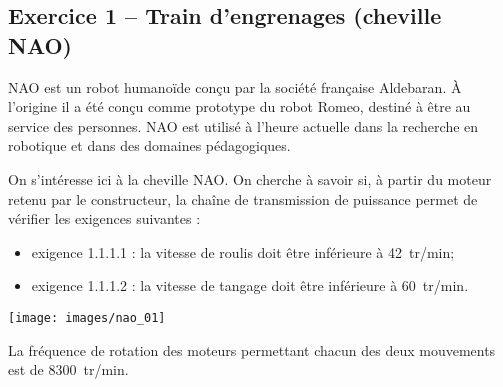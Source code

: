 \documentclass[10pt,fleqn]{article} %
\begin{document}
\def\pathfig{images}

\vspace{4.5cm}
\pagestyle{fancy}
\thispagestyle{plain}

\def\columnseprulecolor{\color{ocre}}
\setlength{\columnseprule}{0.4pt} 

\def\pathfig{images}

\ifprof
\else
\begin{multicols}{2}
\fi


\section*{Exercice 1 -- Train d'engrenages (cheville NAO)}
\setcounter{exo}{0}


NAO est un robot humanoïde conçu par la société française Aldebaran. À l'origine il a été conçu comme prototype du robot Romeo, destiné à être au service des personnes. NAO est utilisé à l'heure actuelle dans la recherche en robotique et dans des domaines pédagogiques. 
\begin{obj}
On s'intéresse ici à la cheville NAO. On cherche à savoir si, à partir du moteur retenu par le constructeur, la chaîne de transmission de puissance permet de vérifier les exigences suivantes : 
\begin{itemize}
\item exigence 1.1.1.1 : la vitesse de roulis doit être inférieure à \SI{42}{tr/min};
\item exigence 1.1.1.2 : la vitesse de tangage doit être inférieure à \SI{60}{tr/min}.
\end{itemize}

\end{obj}


\begin{center}
\texttt{[image: images/nao\_01]}
\end{center}

La fréquence de rotation des moteurs permettant chacun des deux mouvements est de \SI{8300}{tr/min}.


\end{multicols}
\end{document}
